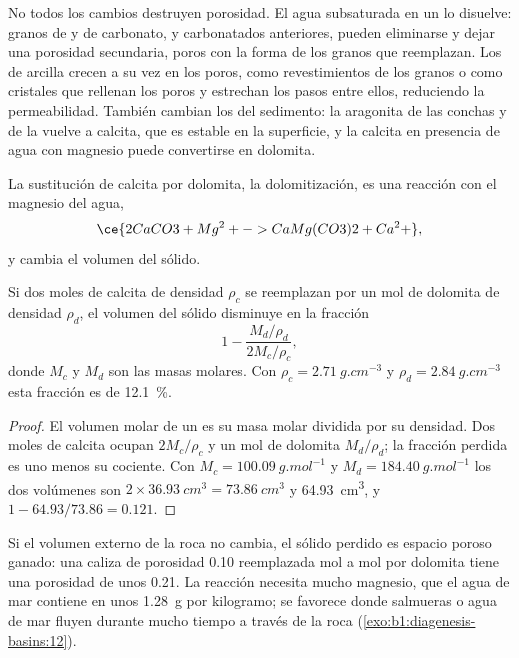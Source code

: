 No todos los cambios destruyen porosidad. El agua subsaturada en un  lo disuelve: granos de  y de carbonato, y  carbonatados anteriores, pueden eliminarse y dejar una
porosidad secundaria, poros con la forma de los granos que reemplazan. Los  de arcilla crecen a su vez en los poros, como revestimientos de los granos o como cristales que rellenan los poros
y estrechan los pasos entre ellos, reduciendo la permeabilidad. También cambian los  del sedimento: la aragonita de las conchas y de la  vuelve a calcita, que es estable en la
superficie, y la calcita en presencia de agua con magnesio puede convertirse en dolomita.

La sustitución de calcita por dolomita, la dolomitización, es una reacción con el magnesio del agua,
\[
  \ce{2 CaCO3 + Mg^2+ -> CaMg(CO3)2 + Ca^2+},
\]
y cambia el volumen del sólido.

\begin{proposition}\label{prop:b1:diagenesis-basins:dolomite}
Si dos moles de calcita de densidad $\rho_c$ se reemplazan por un mol de dolomita de densidad $\rho_d$, el volumen del sólido disminuye en la fracción
\[
  1 - \frac{M_d/\rho_d}{2M_c/\rho_c},
\]
donde $M_c$ y $M_d$ son las masas molares. Con $\rho_c = \qty{2.71}{g.cm^{-3}}$ y $\rho_d = \qty{2.84}{g.cm^{-3}}$ esta fracción es de \qty{12.1}{\percent}.
\end{proposition}

\begin{proof}
El volumen molar de un  es su masa molar dividida por su densidad. Dos moles de calcita ocupan $2M_c/\rho_c$ y un mol de dolomita $M_d/\rho_d$; la fracción perdida es uno menos su cociente. Con
$M_c = \qty{100.09}{g.mol^{-1}}$ y $M_d = \qty{184.40}{g.mol^{-1}}$ los dos volúmenes son
$2\times\qty{36.93}{cm^3} = \qty{73.86}{cm^3}$ y \qty{64.93}{cm^3}, y $1 - 64.93/73.86 = \num{0.121}$.
\end{proof}

Si el volumen externo de la roca no cambia, el sólido perdido es espacio poroso ganado: una caliza de porosidad \num{0.10} reemplazada mol a mol por dolomita tiene una porosidad de unos \num{0.21}.
La reacción necesita mucho magnesio, que el agua de mar contiene en unos \qty{1.28}{g} por kilogramo; se favorece donde salmueras o agua de mar fluyen durante mucho tiempo a través de la roca
(\cref{exo:b1:diagenesis-basins:12}).

